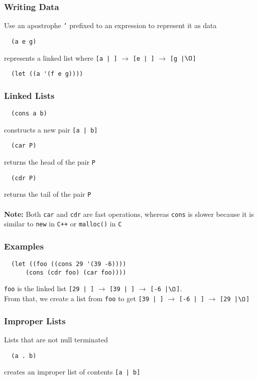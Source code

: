 \documentclass[13pt]{article}
\begin{document}
\subsubsection{Writing Data}
Use an apostrophe \texttt{'} prefixed to an expression to represent it as data
\begin{verbatim}
  (a e g) \end{verbatim}
represents a linked list where \texttt{[a | ]} $\rightarrow$ \texttt{[e | ]} $\rightarrow$ \texttt{[g |$\O$]}
\begin{verbatim}
  (let ((a '(f e g))))\end{verbatim}

\subsubsection{Linked Lists}
\begin{verbatim}
  (cons a b) \end{verbatim}
constructs a new pair \texttt{[a | b]}
\begin{verbatim}
  (car P) \end{verbatim}
returns the head of the pair \texttt{P}
\begin{verbatim}
  (cdr P) \end{verbatim}
returns the tail of the pair \texttt{P} \\ \\
\textbf{Note:} Both \texttt{car} and \texttt{cdr} are fast operations, whereas \texttt{cons} is slower because it is similar to \texttt{new} in \texttt{C++} or \texttt{malloc()} in \texttt{C}

\subsubsection*{Examples}
\begin{verbatim}
  (let ((foo ((cons 29 '(39 -6))))
      (cons (cdr foo) (car foo)))) \end{verbatim}
    \texttt{foo} is the linked list \texttt{[29 | ]} $\rightarrow$ \texttt{[39 | ]} $\rightarrow$ \texttt{[-6 |$\O$]}. \\
    From that, we create a list from \texttt{foo} to get \texttt{[39 | ]} $\rightarrow$ \texttt{[-6 | ]} $\rightarrow$ \texttt{[29 |$\O$]}

    \subsubsection{Improper Lists}
    Lists that are not null terminated
\begin{verbatim}
  (a . b) \end{verbatim}
creates an improper list of contents \texttt{[a | b]}
\end{document}
